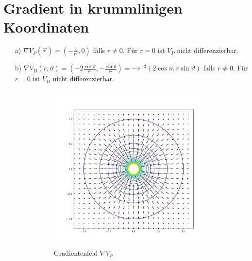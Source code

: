 \documentclass[11pt]{article}
\theoremstyle{plain}
\theoremstyle{definition}
\theoremstyle{remark}
\newcommand{\D}{\displaystyle}
\begin{document}
\section{Gradient in krummlinigen Koordinaten}

\begin{itemize}
\item[a)] 
$\D \nabla V_P (\vec r) = \left(-\frac{1}{r^2}, 0\right)$ falls $ r \neq 0 $. Für $ r=0 $ ist $ V_P $ nicht differenzierbar. 

\item[b)] 
$ \D \nabla V_D (r,\vartheta) = \left( -2 \frac{\cos \vartheta}{r^3} , - \frac{\sin \vartheta}{r^2} \right) = -r^{-3} (2\cos \vartheta,r\sin\vartheta) $ falls $ r \neq 0 $. Für $ r=0 $ ist $ V_D $ nicht differenzierbar.

\begin{figure}[h]
	\begin{subfigure}{0.5\textwidth}
		\includegraphics[width=\linewidth]{VP.png} 
		\caption{Gradientenfeld $\nabla V_P$}
	\end{subfigure}
	\begin{subfigure}{0.5\textwidth}

\end{subfigure}
\end{figure}
\end{itemize}
\end{document}
